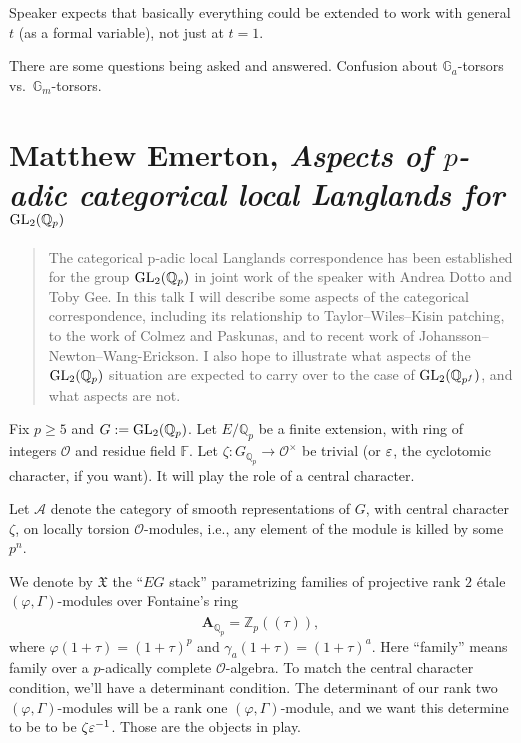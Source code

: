 \documentclass[reqno]{amsart} 
\begin{document}
\begin{remark}
  Speaker expects that basically everything could be extended to work with general $t$ (as a formal variable), not just at $t = 1$.
\end{remark}

There are some questions being asked and answered.   Confusion about $\mathbb{G}_a$-torsors vs.\ $\mathbb{G}_m$-torsors.

\part{Matthew Emerton, \emph{Aspects of $p$-adic categorical local Langlands for $\operatorname{GL}_2(\mathbb{Q}_p)$}}

\begin{abstract}
  The categorical p-adic local Langlands correspondence has been established for the group $\operatorname{GL}_2(\mathbb{Q}_p)$ in joint work of the speaker with Andrea Dotto and Toby Gee. In this talk I will describe some aspects of the categorical correspondence, including its relationship to Taylor--Wiles--Kisin patching, to the work of Colmez and Paskunas, and to recent work of Johansson--Newton--Wang-Erickson. I also hope to illustrate what aspects of the $\operatorname{GL}_2(\mathbb{Q}_p)$ situation are expected to carry over to the case of $\operatorname{GL}_2(\mathbb{Q}_{p^f})$, and what aspects are not.
\end{abstract}

Fix $p \geq 5$ and $G := \operatorname{GL}_2(\mathbb{Q}_p)$.  Let $E / \mathbb{Q}_p$ be a finite extension, with ring of integers $\mathcal{O}$ and residue field $\mathbb{F}$.  Let $\zeta : G_{\mathbb{Q}_p} \rightarrow \mathcal{O}^\times$ be trivial (or $\varepsilon$, the cyclotomic character, if you want).  It will play the role of a central character.

Let $\mathcal{A}$ denote the category of smooth representations of $G$, with central character $\zeta$, on locally torsion $\mathcal{O}$-modules, i.e., any element of the module is killed by some $p^n$.

We denote by $\mathfrak{X}$ the ``$E G$ stack'' parametrizing families of projective rank $2$ {\'e}tale $(\varphi, \Gamma)$-modules over Fontaine's ring
\begin{equation*}
  \mathbf{A}_{\mathbb{Q}_p} = \widehat{\mathbb{Z}_p((\tau))},
\end{equation*}
where $\varphi(1 + \tau) =(1 + \tau)^p$ and $\gamma_a(1 + \tau) =(1 + \tau)^a$.  Here ``family'' means family over a $p$-adically complete $\mathcal{O}$-algebra.  To match the central character condition, we'll have a determinant condition.  The determinant of our rank two $(\varphi, \Gamma)$-modules will be a rank one $(\varphi, \Gamma)$-module, and we want this determine to be to be $\zeta \varepsilon^{-1}$.  Those are the objects in play.
\end{document}

